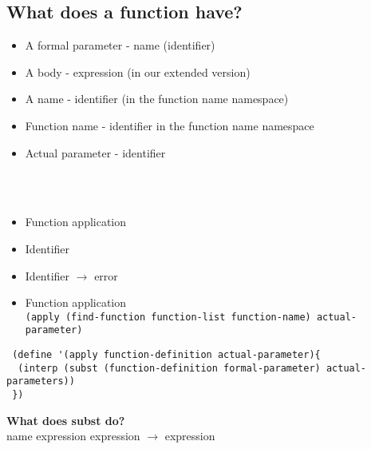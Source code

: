 \documentclass{article}
\newcommand\tab[1][1cm]{\hspace*{#1}}
\begin{document}
\begin{flushleft}
\section*{What does a function have?}
\begin{itemize}
 \item A formal parameter - name (identifier)
 \item A body - expression (in our extended version)
 \item A name - identifier (in the function name namespace)
 \item Function name - identifier in the function name namespace
 \item Actual parameter - identifier
\end{itemize}
\tab{Extend our expression data definition.}\\
\tab{We need to add two more variants.}\\
\begin{itemize}
 \item Function application
 \item Identifier
\end{itemize}
\tab{We need to extend the interpreter to deal with the two new variants in the data definition.}
\begin{itemize}
 \item Identifier $\rightarrow$ error
 \item Function application\\
 \verb|(apply (find-function function-list function-name) actual-parameter)|
\end{itemize}
\tab{Statement of purpose for apply, substitute the actual parameter for the formal parameter everywhere in the body of the function, then evaluate the result.}

\begin{verbatim}
 (define '(apply function-definition actual-parameter){
  (interp (subst (function-definition formal-parameter) actual-parameters))
 })
\end{verbatim}
\pagebreak
\textbf{What does subst do?}\\
name expression expression $\rightarrow$ expression


\end{flushleft}
\end{document}
